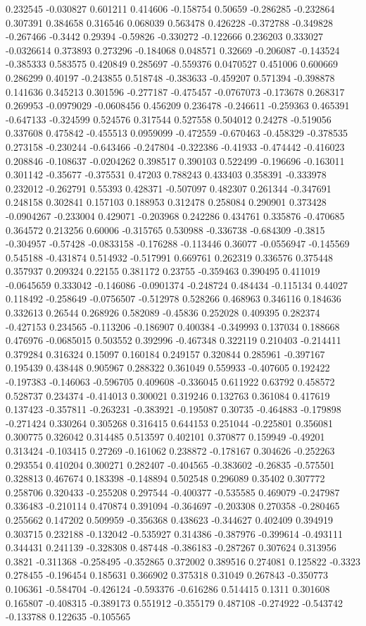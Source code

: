 0.232545 -0.030827 0.601211 0.414606 -0.158754 0.50659 -0.286285 -0.232864 0.307391 0.384658 0.316546 0.068039 0.563478 0.426228 -0.372788 -0.349828 -0.267466 -0.3442 0.29394 -0.59826 -0.330272 -0.122666 0.236203 0.333027 -0.0326614 0.373893 0.273296 -0.184068 0.048571 0.32669 -0.206087 -0.143524 -0.385333 0.583575 0.420849 0.285697 -0.559376 0.0470527 0.451006 0.600669 0.286299 0.40197 -0.243855 0.518748 -0.383633 -0.459207 0.571394 -0.398878 0.141636 0.345213 0.301596 -0.277187 -0.475457 -0.0767073 -0.173678 0.268317 0.269953 -0.0979029 -0.0608456 0.456209 0.236478 -0.246611 -0.259363 0.465391 -0.647133 -0.324599 0.524576 0.317544 0.527558 0.504012 0.24278 -0.519056 0.337608 0.475842 -0.455513 0.0959099 -0.472559 -0.670463 -0.458329 -0.378535 0.273158 -0.230244 -0.643466 -0.247804 -0.322386 -0.41933 -0.474442 -0.416023 0.208846 -0.108637 -0.0204262 0.398517 0.390103 0.522499 -0.196696 -0.163011 0.301142 -0.35677 -0.375531 0.47203 0.788243 0.433403 0.358391 -0.333978 0.232012 -0.262791 0.55393 0.428371 -0.507097 0.482307 0.261344 -0.347691 0.248158 0.302841 0.157103 0.188953 0.312478 0.258084 0.290901 0.373428 -0.0904267 -0.233004 0.429071 -0.203968 0.242286 0.434761 0.335876 -0.470685 0.364572 0.213256 0.60006 -0.315765 0.530988 -0.336738 -0.684309 -0.3815 -0.304957 -0.57428 -0.0833158 -0.176288 -0.113446 0.36077 -0.0556947 -0.145569 0.545188 -0.431874 0.514932 -0.517991 0.669761 0.262319 0.336576 0.375448 0.357937 0.209324 0.22155 0.381172 0.23755 -0.359463 0.390495 0.411019 -0.0645659 0.333042 -0.146086 -0.0901374 -0.248724 0.484434 -0.115134 0.44027 0.118492 -0.258649 -0.0756507 -0.512978 0.528266 0.468963 0.346116 0.184636 0.332613 0.26544 0.268926 0.582089 -0.45836 0.252028 0.409395 0.282374 -0.427153 0.234565 -0.113206 -0.186907 0.400384 -0.349993 0.137034 0.188668 0.476976 -0.0685015 0.503552 0.392996 -0.467348 0.322119 0.210403 -0.214411 0.379284 0.316324 0.15097 0.160184 0.249157 0.320844 0.285961 -0.397167 0.195439 0.438448 0.905967 0.288322 0.361049 0.559933 -0.407605 0.192422 -0.197383 -0.146063 -0.596705 0.409608 -0.336045 0.611922 0.63792 0.458572 0.528737 0.234374 -0.414013 0.300021 0.319246 0.132763 0.361084 0.417619 0.137423 -0.357811 -0.263231 -0.383921 -0.195087 0.30735 -0.464883 -0.179898 -0.271424 0.330264 0.305268 0.316415 0.644153 0.251044 -0.225801 0.356081 0.300775 0.326042 0.314485 0.513597 0.402101 0.370877 0.159949 -0.49201 0.313424 -0.103415 0.27269 -0.161062 0.238872 -0.178167 0.304626 -0.252263 0.293554 0.410204 0.300271 0.282407 -0.404565 -0.383602 -0.26835 -0.575501 0.328813 0.467674 0.183398 -0.148894 0.502548 0.296089 0.35402 0.307772 0.258706 0.320433 -0.255208 0.297544 -0.400377 -0.535585 0.469079 -0.247987 0.336483 -0.210114 0.470874 0.391094 -0.364697 -0.203308 0.270358 -0.280465 0.255662 0.147202 0.509959 -0.356368 0.438623 -0.344627 0.402409 0.394919 0.303715 0.232188 -0.132042 -0.535927 0.314386 -0.387976 -0.399614 -0.493111 0.344431 0.241139 -0.328308 0.487448 -0.386183 -0.287267 0.307624 0.313956 0.3821 -0.311368 -0.258495 -0.352865 0.372002 0.389516 0.274081 0.125822 -0.3323 0.278455 -0.196454 0.185631 0.366902 0.375318 0.31049 0.267843 -0.350773 0.106361 -0.584704 -0.426124 -0.593376 -0.616286 0.514415 0.1311 0.301608 0.165807 -0.408315 -0.389173 0.551912 -0.355179 0.487108 -0.274922 -0.543742 -0.133788 0.122635 -0.105565 